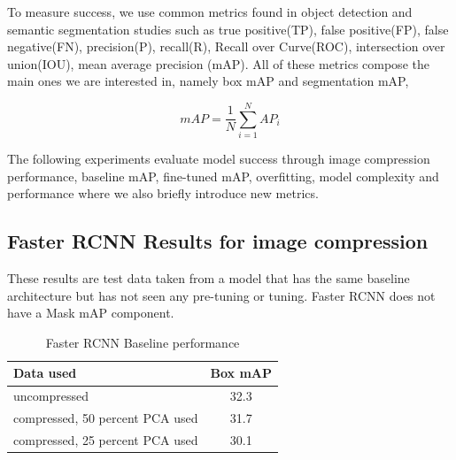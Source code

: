 \documentclass[10pt,twocolumn,letterpaper]{article}
\begin{document}

To measure success, we use common metrics found in object detection and semantic segmentation studies\cite{padilla2020survey} such as true positive(TP), false positive(FP), false negative(FN), precision(P), recall(R), Recall over Curve(ROC), intersection over union(IOU), mean average precision (mAP). All of these metrics compose the main ones we are interested in, namely box mAP and segmentation mAP, 

\begin{equation}
mAP = \frac{1}{N} \sum_{i=1}^N AP_i
\end{equation}

The following experiments evaluate model success through image compression performance, baseline mAP, fine-tuned mAP, overfitting, model complexity and performance where we also briefly introduce new metrics.


\subsection{Faster RCNN Results for image compression}
These results are test data taken from a model that has the same baseline architecture but has not seen any pre-tuning or tuning. Faster RCNN does not have a Mask mAP component. 

\begin{table}[hbt!]
\begin{center}
\begin{tabular}{|l|c|}
\hline
Data used   & Box mAP \\
\hline\hline
uncompressed & 32.3 \\
compressed, 50 percent PCA used & 31.7 \\
compressed, 25 percent PCA used & 30.1 \\
\hline
\end{tabular}
\end{center}
\caption{Faster RCNN Baseline performance}
\end{table}
\end{document}
